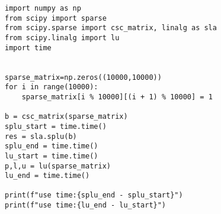 \documentclass[11pt]{article}
\begin{document}
\begin{lstlisting}
import numpy as np
from scipy import sparse
from scipy.sparse import csc_matrix, linalg as sla
from scipy.linalg import lu
import time


sparse_matrix=np.zeros((10000,10000))
for i in range(10000):
    sparse_matrix[i % 10000][(i + 1) % 10000] = 1

b = csc_matrix(sparse_matrix)
splu_start = time.time()
res = sla.splu(b)
splu_end = time.time()
lu_start = time.time()
p,l,u = lu(sparse_matrix)
lu_end = time.time()

print(f"use time:{splu_end - splu_start}")
print(f"use time:{lu_end - lu_start}")
\end{lstlisting}
\end{document}
